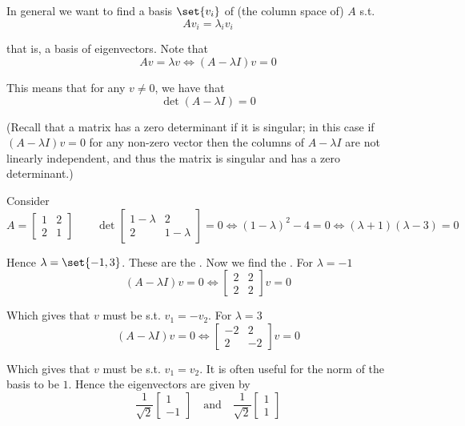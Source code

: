 \documentclass{article}
\begin{document}
In general we want to find a basis $\set{v_i}$ of (the column space of) $A$ s.t.
\[
  Av_i = \lambda_i v_i
\]

that is, a basis of eigenvectors. Note that
\[
  Av = \lambda v
  \iff
  (A - \lambda I) v = 0
\]

This means that for any $v \ne 0$, we have that
\[
  \det(A - \lambda I) = 0
\]

(Recall that a matrix has a zero determinant if it is singular; in this case if$(A - \lambda I)v = 0$ for any non-zero vector then the columns of $A - \lambda I$ are not linearly independent, and thus the matrix is singular and has a zero determinant.)

\begin{example}
  Consider
  \[
    A = \left[\begin{matrix}
        1 & 2 \\ 2 & 1
    \end{matrix}\right]
    \quad\quad
    \det
    \left[\begin{matrix}
        1 - \lambda & 2 \\ 2 & 1 - \lambda
    \end{matrix}\right]
    = 0
    \iff
    (1 - \lambda)^2 - 4 = 0
    \iff
    (\lambda + 1)(\lambda - 3) = 0
  \]

  Hence $\lambda = \set{-1, 3}$. These are the . Now we find the . For $\lambda = -1$
  \[
    (A - \lambda I)v = 0
    \iff
    \left[\begin{matrix}
        2 & 2 \\ 2 & 2
    \end{matrix}\right] v = 0
  \]

  Which gives that $v$ must be s.t. $v_1 = -v_2$. For $\lambda = 3$
  \[
    (A - \lambda I)v = 0
    \iff
    \left[\begin{matrix}
        -2 & 2 \\ 2 & -2
    \end{matrix}\right] v = 0
  \]

  Which gives that $v$ must be s.t. $v_1 = v_2$. It is often useful for the norm of the basis to be $1$. Hence the eigenvectors are given by
  \[
    \dfrac{1}{\sqrt{2}}
    \left[\begin{matrix}
      1 \\ -1
    \end{matrix}\right]
    \quad\text{and}\quad
    \dfrac{1}{\sqrt{2}}
    \left[\begin{matrix}
      1 \\ 1
    \end{matrix}\right]
  \]
\end{example}
\end{document}
